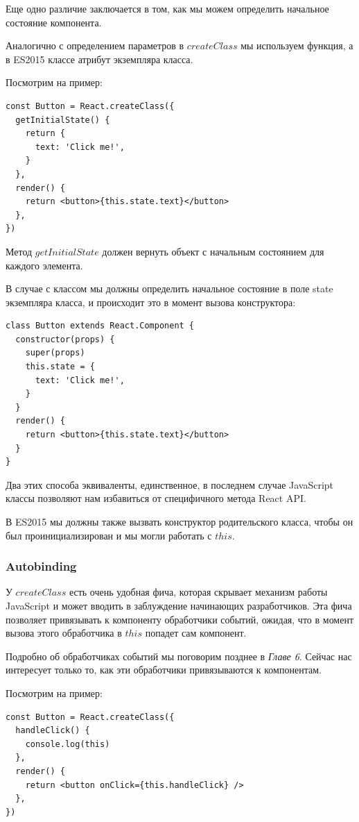 Еще одно различие заключается в том, как мы можем определить начальное состояние компонента.

Аналогично с определением параметров в $createClass$ мы используем функция, а в ES2015 классе атрибут экземпляра класса.

Посмотрим на пример:

\begin{lstlisting}
const Button = React.createClass({
  getInitialState() {
    return {
      text: 'Click me!',
    } 
  },
  render() {
    return <button>{this.state.text}</button>
  }, 
})
\end{lstlisting}

Метод $getInitialState$ должен вернуть объект с начальным состоянием для каждого элемента.

В случае с классом мы должны определить начальное состояние в поле state экземпляра класса, и происходит это в момент вызова конструктора:

\begin{lstlisting}
class Button extends React.Component {
  constructor(props) {
    super(props)
    this.state = {
      text: 'Click me!',
    }
  }
  render() {
    return <button>{this.state.text}</button>
  } 
}
\end{lstlisting}

Два этих способа эквиваленты, единственное, в последнем случае JavaScript классы позволяют нам избавиться от специфичного метода React API.

В ES2015 мы должны также вызвать конструктор родительского класса, чтобы он был проинициализирован и мы могли работать с $this$.

\subsubsection{Autobinding}

У $createClass$ есть очень удобная фича, которая скрывает механизм работы JavaScript и может вводить в заблуждение начинающих разработчиков. Эта фича позволяет привязывать к компоненту обработчики событий, ожидая, что в момент вызова этого обработчика в $this$ попадет сам компонент.

Подробно об обработчиках событий мы поговорим позднее в \textit{Главе 6}. Сейчас нас интересует только то, как эти обработчики привязываются к компонентам.

Посмотрим на пример:

\begin{lstlisting}
const Button = React.createClass({
  handleClick() {
    console.log(this)
  },
  render() {
    return <button onClick={this.handleClick} />
  }, 
})
\end{lstlisting}

